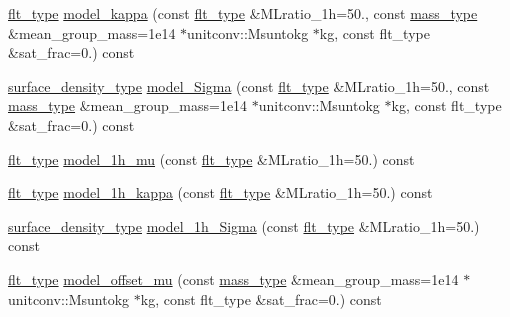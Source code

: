 \begin{DoxyCompactItemize}
\item 
\hyperlink{lib_2IceBRG__main_2common_8h_ad0f130a56eeb944d9ef2692ee881ecc4}{flt\+\_\+type} \hyperlink{classIceBRG_1_1pair__bin__summary_aa93614ecebce56d9336d856925ed1154}{model\+\_\+kappa} (const \hyperlink{lib_2IceBRG__main_2common_8h_ad0f130a56eeb944d9ef2692ee881ecc4}{flt\+\_\+type} \&M\+Lratio\+\_\+1h=50., const \hyperlink{namespaceIceBRG_a1be72ac4918a9b029f2eefa084213e35}{mass\+\_\+type} \&mean\+\_\+group\+\_\+mass=1e14 $\ast$unitconv\+::\+Msuntokg $\ast$kg, const flt\+\_\+type \&sat\+\_\+frac=0.) const 
\item 
\hyperlink{namespaceIceBRG_a80c597ef5ba0a32491d32a9f0083b02d}{surface\+\_\+density\+\_\+type} \hyperlink{classIceBRG_1_1pair__bin__summary_a1627a07bc392e0a876f5257b5b614622}{model\+\_\+\+Sigma} (const \hyperlink{lib_2IceBRG__main_2common_8h_ad0f130a56eeb944d9ef2692ee881ecc4}{flt\+\_\+type} \&M\+Lratio\+\_\+1h=50., const \hyperlink{namespaceIceBRG_a1be72ac4918a9b029f2eefa084213e35}{mass\+\_\+type} \&mean\+\_\+group\+\_\+mass=1e14 $\ast$unitconv\+::\+Msuntokg $\ast$kg, const flt\+\_\+type \&sat\+\_\+frac=0.) const 
\item 
\hyperlink{lib_2IceBRG__main_2common_8h_ad0f130a56eeb944d9ef2692ee881ecc4}{flt\+\_\+type} \hyperlink{classIceBRG_1_1pair__bin__summary_a1acf154add21e045b2b58cce9eeb0a14}{model\+\_\+1h\+\_\+mu} (const \hyperlink{lib_2IceBRG__main_2common_8h_ad0f130a56eeb944d9ef2692ee881ecc4}{flt\+\_\+type} \&M\+Lratio\+\_\+1h=50.) const 
\item 
\hyperlink{lib_2IceBRG__main_2common_8h_ad0f130a56eeb944d9ef2692ee881ecc4}{flt\+\_\+type} \hyperlink{classIceBRG_1_1pair__bin__summary_a94306f4cf7cec2c34473bc9898817d6e}{model\+\_\+1h\+\_\+kappa} (const \hyperlink{lib_2IceBRG__main_2common_8h_ad0f130a56eeb944d9ef2692ee881ecc4}{flt\+\_\+type} \&M\+Lratio\+\_\+1h=50.) const 
\item 
\hyperlink{namespaceIceBRG_a80c597ef5ba0a32491d32a9f0083b02d}{surface\+\_\+density\+\_\+type} \hyperlink{classIceBRG_1_1pair__bin__summary_a3e6d7987aadd12908687bc77d0eaed09}{model\+\_\+1h\+\_\+\+Sigma} (const \hyperlink{lib_2IceBRG__main_2common_8h_ad0f130a56eeb944d9ef2692ee881ecc4}{flt\+\_\+type} \&M\+Lratio\+\_\+1h=50.) const 
\item 
\hyperlink{lib_2IceBRG__main_2common_8h_ad0f130a56eeb944d9ef2692ee881ecc4}{flt\+\_\+type} \hyperlink{classIceBRG_1_1pair__bin__summary_a1b4ff7d510022de3c9c6d5794db7ea98}{model\+\_\+offset\+\_\+mu} (const \hyperlink{namespaceIceBRG_a1be72ac4918a9b029f2eefa084213e35}{mass\+\_\+type} \&mean\+\_\+group\+\_\+mass=1e14 $\ast$unitconv\+::\+Msuntokg $\ast$kg, const flt\+\_\+type \&sat\+\_\+frac=0.) const 

\end{DoxyCompactItemize}
